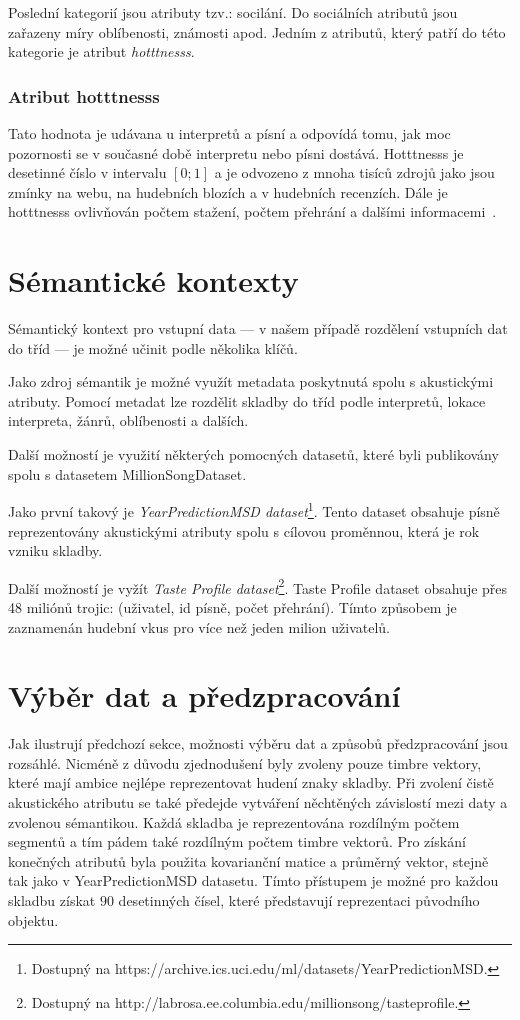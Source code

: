 \documentclass[thesis=M,czech]{FITthesis}[2012/06/26]
\begin{document}
Poslední kategorií jsou atributy tzv.: socilání. Do sociálních atributů jsou zařazeny míry oblíbenosti, známosti apod. Jedním z atributů, který patří do této kategorie je atribut \textit{hotttnesss}.

\subsubsection{Atribut hotttnesss}\label{sec:hotttnesss}

Tato hodnota je udávana u interpretů a písní a odpovídá tomu, jak moc pozornosti se v současné době interpretu nebo písni dostává.
Hotttnesss je desetinné číslo v intervalu $[0;1]$ a je odvozeno z mnoha tisíců zdrojů jako jsou zmínky na webu, na hudebních blozích a v hudebních recenzích. Dále je hotttnesss ovlivňován počtem stažení, počtem přehrání a dalšími informacemi~\cite{hotttnesss}.

\section{Sémantické kontexty}\label{sec:semcontext}
Sémantický kontext pro vstupní data --- v našem případě rozdělení vstupních dat do tříd --- je možné učinit podle několika klíčů.

Jako zdroj sémantik je možné využít metadata poskytnutá spolu s akustickými atributy. Pomocí metadat lze rozdělit skladby do tříd podle interpretů, lokace interpreta, žánrů, oblíbenosti a dalších. 

Další možností je využití některých pomocných datasetů, které byli publikovány spolu s datasetem MillionSongDataset.

Jako první takový je \textit{YearPredictionMSD dataset}\footnote{Dostupný na https://archive.ics.uci.edu/ml/datasets/YearPredictionMSD.}. Tento dataset obsahuje písně reprezentovány akustickými atributy spolu s cílovou proměnnou, která je rok vzniku skladby. 

Další možností je vyžít \textit{Taste Profile dataset}\footnote{Dostupný na http://labrosa.ee.columbia.edu/millionsong/tasteprofile.}. Taste Profile dataset obsahuje přes 48 miliónů trojic: (uživatel, id písně, počet přehrání). Tímto způsobem je zaznamenán hudební vkus pro více než jeden milion uživatelů.


\section{Výběr dat a předzpracování}
Jak ilustrují předchozí sekce, možnosti výběru dat a způsobů předzpracování jsou rozsáhlé. Nicméně z důvodu zjednodušení byly zvoleny pouze timbre vektory, které mají ambice nejlépe reprezentovat hudení znaky skladby. Při zvolení čistě akustického atributu se také předejde vytváření něchtěných závislostí mezi daty a zvolenou sémantikou. Každá skladba je reprezentována rozdílným počtem segmentů a tím pádem také rozdílným počtem timbre vektorů. Pro získání konečných atributů byla použita kovarianční matice a průměrný vektor, stejně tak jako v YearPredictionMSD datasetu. Tímto přístupem je možné pro každou skladbu získat $90$ desetinných čísel, které představují reprezentaci původního objektu. 
\end{document}
